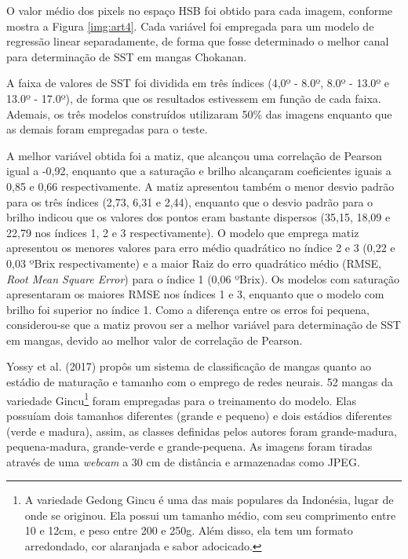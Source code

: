 O valor médio dos pixels no espaço HSB foi obtido para cada imagem, conforme mostra a Figura \ref{img:art4}. Cada variável foi empregada para um modelo de regressão linear separadamente, de forma que fosse determinado o melhor canal para determinação de SST em mangas Chokanan.


A faixa de valores de SST foi dividida em três índices (4,0º - 8.0º, 8.0º - 13.0º e 13.0º - 17.0º), de forma que os resultados estivessem em função de cada faixa. Ademais, os três modelos construídos utilizaram 50\% das imagens enquanto que as demais foram empregadas para o teste. 

A melhor variável obtida foi a matiz, que alcançou uma correlação de Pearson igual a -0,92, enquanto que a saturação e brilho alcançaram coeficientes iguais a 0,85 e 0,66 respectivamente. A matiz apresentou também o menor desvio padrão para os três índices (2,73, 6,31 e 2,44), enquanto que o desvio padrão para o brilho indicou que os valores dos pontos eram bastante dispersos (35,15, 18,09 e 22,79 nos índices 1, 2 e 3 respectivamente). O modelo que emprega matiz apresentou os menores valores para erro médio quadrático no índice 2 e 3 (0,22 e 0,03 ºBrix respectivamente) e a maior Raiz do erro quadrático médio (RMSE, \textit{Root Mean Square Error}) para o índice 1 (0,06 ºBrix). Os modelos com saturação apresentaram os maiores RMSE nos índices 1 e 3, enquanto que o modelo com brilho foi superior no índice 1. Como a diferença entre os erros foi pequena, considerou-se que a matiz provou ser a melhor variável para determinação de SST em mangas, devido ao melhor valor de correlação de Pearson. 

Yossy et al. (2017) propôs um sistema de classificação de mangas quanto ao estádio de maturação e tamanho com o emprego de redes neurais. 52 mangas da variedade Gincu\footnote{\label{ftnote:gincu}A variedade Gedong Gincu é uma das mais populares da Indonésia, lugar de onde se originou. Ela possui um tamanho médio, com seu comprimento entre 10 e 12cm, e peso entre 200 e 250g. Além disso, ela tem um formato arredondado, cor alaranjada e sabor adocicado.} foram empregadas para o treinamento do modelo. Elas possuíam dois tamanhos diferentes (grande e pequeno) e dois estádios diferentes (verde e madura), assim, as classes definidas pelos autores foram grande-madura, pequena-madura, grande-verde e grande-pequena. As imagens foram tiradas através de uma \textit{webcam} a 30 cm de distância e armazenadas como JPEG.

